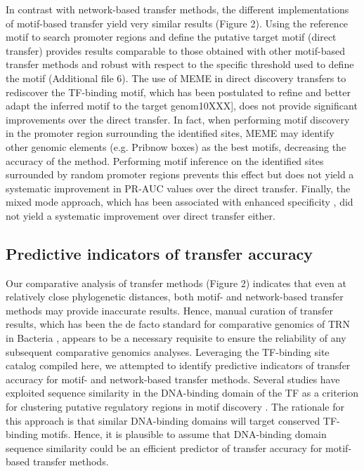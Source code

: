 In contrast with network-based transfer methods, the different implementations
of motif-based transfer yield very similar results (Figure 2). Using the
reference motif to search promoter regions and define the putative target motif
(direct transfer) provides results comparable to those obtained with other
motif-based transfer methods and robust with respect to the specific threshold
used to define the motif (Additional file 6). The use of MEME in direct
discovery transfers to rediscover the TF-binding motif, which has been
postulated to refine and better adapt the inferred motif to the target
genom10XXX], does not provide significant improvements over the direct
transfer. In fact, when performing motif discovery in the promoter region
surrounding the identified sites, MEME may identify other genomic elements
(e.g. Pribnow boxes) as the best motifs, decreasing the accuracy of the
method. Performing motif inference on the identified sites surrounded by random
promoter regions prevents this effect but does not yield a systematic
improvement in PR-AUC values over the direct transfer. Finally, the mixed mode
approach, which has been associated with enhanced specificity
\cite{baumbach2010power, baumbach2009reliable}, did not yield a systematic
improvement over direct transfer either.

\subsection{Predictive indicators of transfer accuracy}

Our comparative analysis of transfer methods (Figure 2) indicates that even at
relatively close phylogenetic distances, both motif- and network-based transfer
methods may provide inaccurate results. Hence, manual curation of transfer
results, which has been the de facto standard for comparative genomics of TRN
in Bacteria \cite{tan2001comparative, erill2004differences,
  gelfand2000comparative, novichkov2010regpredict}, appears to be a necessary
requisite to ensure the reliability of any subsequent comparative genomics
analyses. Leveraging the TF-binding site catalog compiled here, we attempted to
identify predictive indicators of transfer accuracy for motif- and
network-based transfer methods. Several studies have exploited sequence
similarity in the DNA-binding domain of the TF as a criterion for clustering
putative regulatory regions in motif discovery \cite{francke2008generic,
  ravcheev2014comparative, dufour2010reconstruction, sahota2010novel}. The
rationale for this approach is that similar DNA-binding domains will target
conserved TF-binding motifs. Hence, it is plausible to assume that DNA-binding
domain sequence similarity could be an efficient predictor of transfer accuracy
for motif-based transfer methods.

